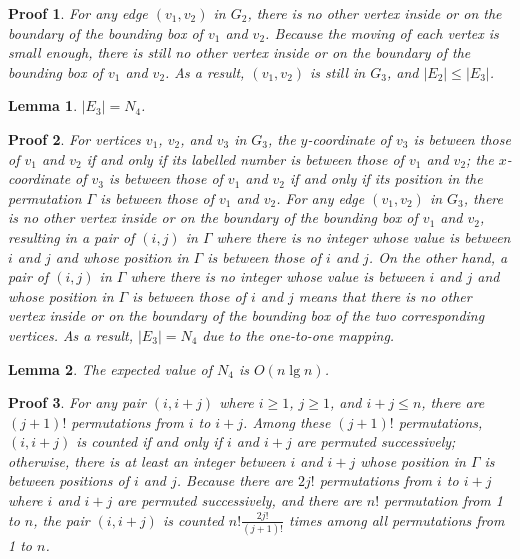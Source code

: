 \documentclass[]{article}
\newtheorem{Lemma}{Lemma}
\newtheorem{Proof}{Proof}
\begin{document}
\begin{qunlist}
{{\begin{Proof}
For any edge $(v_1,v_2)$ in $G_2$, there is no other vertex inside or on the boundary of the bounding box of $v_1$ and $v_2$. Because the moving of each vertex is small enough, there is still no other vertex inside or on the boundary of the bounding box of $v_1$ and $v_2$. As a result, $(v_1,v_2)$ is still in $G_3$, and $|E_2|\leq |E_3|$.
\end{Proof}

\begin{Lemma}\label{lemma:e3-n4}
$|E_3|=N_4$.
\end{Lemma}

\begin{Proof}
For vertices $v_1$, $v_2$, and $v_3$ in $G_3$, the $y$-coordinate of $v_3$ is between those of $v_1$ and $v_2$ if and only if its labelled number is between those of $v_1$ and $v_2$; the $x$-coordinate of $v_3$ is between those of $v_1$ and $v_2$ if and only if its position in the permutation $\Gamma$ is between those of $v_1$ and $v_2$. For any edge $(v_1,v_2)$ in $G_3$, there is no other vertex inside or on the boundary of the bounding box of $v_1$ and $v_2$, resulting in a pair of $(i,j)$ in $\Gamma$ where there is no integer whose value is between $i$ and $j$ and whose position in $\Gamma$ is between those of $i$ and $j$. On the other hand, a pair of $(i,j)$ in $\Gamma$ where there is no integer whose value is between $i$ and $j$ and whose position in $\Gamma$ is between those of $i$ and $j$ means that there is no other vertex inside or on the boundary of the bounding box of the two corresponding vertices. As a result, $|E_3|=N_4$ due to the one-to-one mapping.
\end{Proof}

\begin{Lemma}\label{lemma:n4}
The expected value of $N_4$ is $O(n\lg n)$.
\end{Lemma}

\begin{Proof}
For any pair $(i,i+j)$ where $i\geq 1$, $j\geq 1$, and $i+j\leq n$, there are $(j+1)!$ permutations from $i$ to $i+j$. Among these $(j+1)!$ permutations, $(i,i+j)$ is counted if and only if $i$ and $i+j$ are permuted successively; otherwise, there is at least an integer between $i$ and $i+j$ whose position in $\Gamma$ is between positions of $i$ and $j$. Because there are $2j!$ permutations from $i$ to $i+j$ where $i$ and $i+j$ are permuted successively, and there are $n!$ permutation from 1 to $n$, the pair $(i,i+j)$ is counted $n!\frac{2j!}{(j+1)!}$ times among all permutations from 1 to $n$.


\end{Proof}}}
\end{qunlist}
\end{document}
